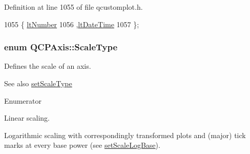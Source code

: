 Definition at line 1055 of file qcustomplot.\+h.


\begin{DoxyCode}
1055                  \{ \hyperlink{class_q_c_p_axis_a4a7da0166f755f5abac23b765d184cada7f1eacf3b73adaefd334bea04e094b7e}{ltNumber}    
1056                    ,\hyperlink{class_q_c_p_axis_a4a7da0166f755f5abac23b765d184cadafc70594a9d877124dd11ccc187d4ac52}{ltDateTime} 
1057                  \};
\end{DoxyCode}
\hypertarget{class_q_c_p_axis_a36d8e8658dbaa179bf2aeb973db2d6f0}{}
\subsubsection[{Scale\+Type}]{\setlength{\rightskip}{0pt plus 5cm}enum {\bf Q\+C\+P\+Axis\+::\+Scale\+Type}}\label{class_q_c_p_axis_a36d8e8658dbaa179bf2aeb973db2d6f0}
Defines the scale of an axis. \begin{DoxySeeAlso}{See also}
\hyperlink{class_q_c_p_axis_adef29cae617af4f519f6c40d1a866ca6}{set\+Scale\+Type} 
\end{DoxySeeAlso}
\begin{Desc}
\item[Enumerator]\par
\begin{description}
\item[{\em 
\hypertarget{class_q_c_p_axis_a36d8e8658dbaa179bf2aeb973db2d6f0aff6e30a11a828bc850caffab0ff994f6}{}st\+Linear\label{class_q_c_p_axis_a36d8e8658dbaa179bf2aeb973db2d6f0aff6e30a11a828bc850caffab0ff994f6}
}]Linear scaling. \item[{\em 
\hypertarget{class_q_c_p_axis_a36d8e8658dbaa179bf2aeb973db2d6f0abf5b785ad976618816dc6f79b73216d4}{}st\+Logarithmic\label{class_q_c_p_axis_a36d8e8658dbaa179bf2aeb973db2d6f0abf5b785ad976618816dc6f79b73216d4}
}]Logarithmic scaling with correspondingly transformed plots and (major) tick marks at every base power (see \hyperlink{class_q_c_p_axis_a726186054be90487885a748aa1b42188}{set\+Scale\+Log\+Base}). \end{description}
\end{Desc}


